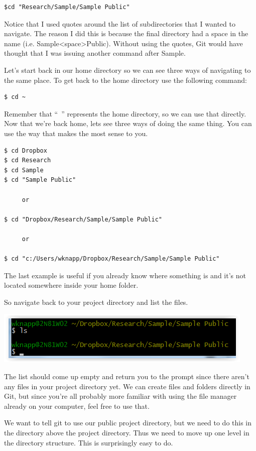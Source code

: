 \documentclass[12pt]{article}
\begin{document}
\begin{verbatim}
$cd "Research/Sample/Sample Public"
\end{verbatim}

Notice that I used quotes around the list of subdirectories that I wanted to navigate.
The reason I did this is because the final directory had a space in the name (i.e.
Sample<space>Public). Without using the quotes, Git would have thought that I was
issuing another command after Sample.

Let's start back in our home directory so we can see three ways of navigating to the same
place. To get back to the home directory use the following command:

\begin{verbatim}
$ cd ~
\end{verbatim}

Remember that ``~'' represents the home directory, so we can use that directly. Now that
we're back home, lets see three ways of doing the same thing. You can use the way that
makes the most sense to you.

\begin{verbatim}
$ cd Dropbox
$ cd Research
$ cd Sample
$ cd "Sample Public"

     or
     
$ cd "Dropbox/Research/Sample/Sample Public"

     or

$ cd "c:/Users/wknapp/Dropbox/Research/Sample/Sample Public"
\end{verbatim}

The last example is useful if you already know where something is and it's not
located somewhere inside your home folder.

So navigate back to your project directory and list the files.

\includegraphics{imgs/Git05.PNG}

The list should come up empty and return you to the prompt since there aren't any files
in your project directory yet. We can create files and folders directly in Git, but
since you're all probably more familiar with using the file manager already on your
computer, feel free to use that.

We want to tell git to use our public project directory, but we need to do this in the
directory above the project directory. Thus we need to move up one level in the
directory structure. This is surprisingly easy to do.
\end{document}
